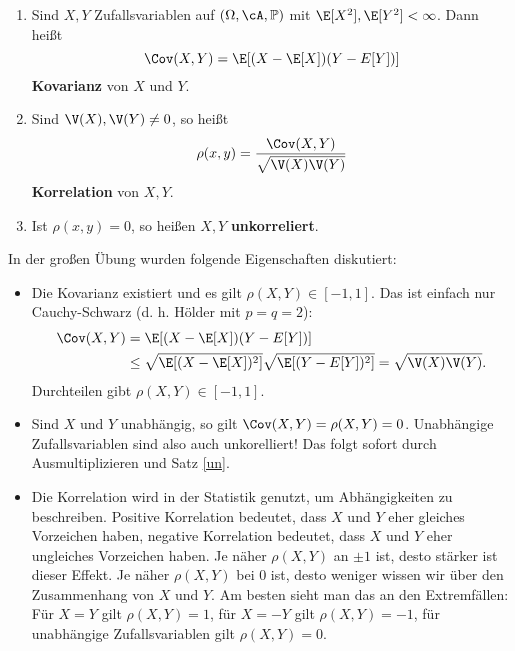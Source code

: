 \begin{deff}\abs
	\begin{enumerate}[label=(\roman*)]
		\item Sind $X,Y$ Zufallsvariablen auf $(\Omega, \cA, \mathbb{P})$ mit $\E[X^2],\E[Y^2] < \infty$. Dann heißt 
		$$\Cov(X,Y) = \E[(X - \E[X])(Y - E[Y])]$$ \textbf{Kovarianz} von $X$ und $Y$.
		\item Sind $\V(X), \V(Y) \neq 0$, so heißt \[ \rho(x,y) = \frac{\Cov(X,Y)}{\sqrt{\V(X)\V(Y)}} \] \textbf{Korrelation} von $X, Y$.
		\item Ist $\rho(x,y) = 0$, so heißen $X,Y$ \textbf{unkorreliert}.
	\end{enumerate} 
\end{deff}
In der gro\ss en \"Ubung wurden folgende Eigenschaften diskutiert:
\begin{bem}\abs
\begin{itemize}
	\item Die Kovarianz existiert und es gilt $\rho(X,Y)\in [-1,1]$. Das ist einfach nur Cauchy-Schwarz (d. h. H\"older mit $p=q=2$):
	\begin{align*}
		\Cov(X,Y)&= \E[(X - \E[X])(Y - E[Y])]\\
		&\leq  \sqrt{\E[(X - \E[X])^2]} \sqrt{ \E[(Y - E[Y])^2]}=\sqrt{\V(X)\V(Y)}.
	\end{align*}
	Durchteilen gibt $\rho(X,Y)\in [-1,1]$.
	\item Sind $X$ und $Y$ unabh\"angig, so gilt $\Cov(X,Y)=\rho(X,Y)=0$. Unabh\"angige Zufallsvariablen sind also auch unkorelliert! Das folgt sofort durch Ausmultiplizieren und Satz \ref{un}. 
	\item Die Korrelation wird in der Statistik genutzt, um Abh\"angigkeiten zu beschreiben. Positive Korrelation bedeutet, dass $X$ und $Y$ eher gleiches Vorzeichen haben, negative Korrelation bedeutet, dass $X$ und $Y$ eher ungleiches Vorzeichen haben. Je n\"aher $\rho(X,Y)$ an $\pm 1$ ist, desto st\"arker ist dieser Effekt. Je n\"aher $\rho(X,Y)$ bei $0$ ist, desto weniger wissen wir \"uber den Zusammenhang von $X$ und $Y$. Am besten sieht man das an den Extremf\"allen: F\"ur $X=Y$ gilt $\rho(X,Y)=1$, f\"ur $X=-Y$ gilt $\rho(X,Y)=-1$, f\"ur unabh\"angige Zufallsvariablen gilt $\rho(X,Y)=0$.
\end{itemize}
\end{bem}


